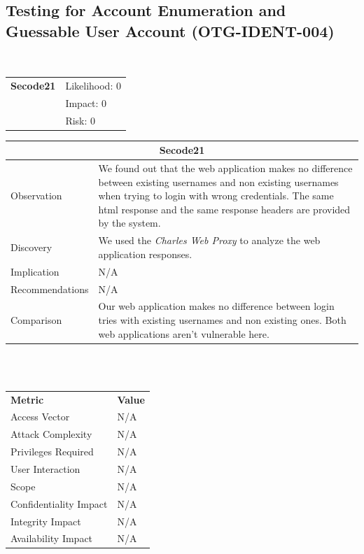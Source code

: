 \documentclass[headsepline,footsepline,footinclude=false,oneside,fontsize=11pt,paper=a4,listof=totoc,bibliography=totoc]{scrbook} %
\begin{document}
\subsection{Testing for Account Enumeration and Guessable User Account (OTG-IDENT-004)}\
\begin{tabular}{cR{12cm}}
	\textbf{Secode21} & Likelihood: 0\\& Impact: 0\\& Risk: 0
\end{tabular}

\begin{tabular}{ l|p{11cm}  }
	\hline
	\multicolumn{2}{c}{\textbf{Secode21}} \\ 
	\hline
	Observation   & We found out that the web application makes no difference between existing usernames and non existing usernames when trying to login with wrong credentials. The same html response and the same response headers are provided by the system. \\
	Discovery  & We used the \textit{Charles Web Proxy} to analyze the web application responses. \\
	Implication    & N/A \\
	Recommendations & N/A \\
	Comparison & Our web application makes no difference between login tries with existing usernames and non existing ones. Both web applications aren't vulnerable here. \\  
	\hline
\end{tabular}
\\
\vspace{0.5cm}
\\
\begin{center}
	\begin{tabular}{ll}
		\rowcolor[HTML]{34CDF9} 
		{\color[HTML]{ECF4FF} \textbf{Metric}}        & {\color[HTML]{ECF4FF} \textbf{Value}} \\
		\rowcolor[HTML]{BBDAFF} 
		{\color[HTML]{333333} Access Vector}          & {\color[HTML]{333333} } N/A              \\
		\rowcolor[HTML]{ECF4FF} 
		{\color[HTML]{333333} Attack Complexity}      & {\color[HTML]{333333} } N/A              \\
		\rowcolor[HTML]{BBDAFF} 
		{\color[HTML]{333333} Privileges Required}    & {\color[HTML]{333333} } N/A              \\
		\rowcolor[HTML]{ECF4FF} 
		{\color[HTML]{333333} User Interaction}       & {\color[HTML]{333333} } N/A              \\
		\rowcolor[HTML]{BBDAFF} 
		{\color[HTML]{333333} Scope}                  & {\color[HTML]{333333} } N/A              \\
		\rowcolor[HTML]{ECF4FF} 
		{\color[HTML]{333333} Confidentiality Impact} & {\color[HTML]{333333} } N/A              \\
		\rowcolor[HTML]{BBDAFF} 
		{\color[HTML]{333333} Integrity Impact}       & {\color[HTML]{333333} } N/A              \\
		\rowcolor[HTML]{ECF4FF} 
		{\color[HTML]{333333} Availability Impact}    & {\color[HTML]{333333} } N/A             
	\end{tabular}
\end{center}
\pagebreak
\end{document}
